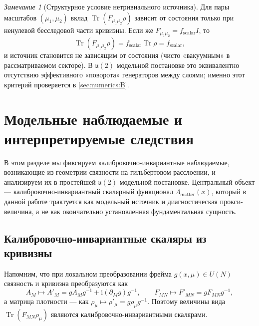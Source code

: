 \documentclass[11pt,a4paper]{article}
\DeclareMathOperator{\Tr}{Tr}
\newcommand{\ii}{\mathrm{i}}
\theoremstyle{definition}
\theoremstyle{plain}
\theoremstyle{remark}
\newtheorem{remark}{Замечание}[section]
\begin{document}
\begin{remark}[Структурное условие нетривиального источника]\label{rem:nontrivial_source}
Для пары масштабов $(\mu_1,\mu_2)$ вклад
$\Tr\!\left(F_{\mu_1\mu_2}\rho\right)$
зависит от состояния только при ненулевой бесследовой части кривизны.
Если же $F_{\mu_1\mu_2}=f_{\mathrm{scalar}}I$, то
\[
\Tr\!\left(F_{\mu_1\mu_2}\rho\right)=f_{\mathrm{scalar}}\Tr\rho=f_{\mathrm{scalar}},
\]
и источник становится не зависящим от состояния (чисто «вакуумным» в рассматриваемом секторе).
В $\mathfrak u(2)$ модельной постановке это эквивалентно отсутствию эффективного «поворота» генераторов между слоями;
именно этот критерий проверяется в \cref{sec:numerics:B}.
\end{remark}

\section{Модельные наблюдаемые и интерпретируемые следствия}
\label{sec:theory}

В этом разделе мы фиксируем калибровочно-инвариантные наблюдаемые, возникающие из геометрии связности на
гильбертовом расслоении, и анализируем их в простейшей $\mathfrak{u}(2)$ модельной постановке.
Центральный объект --- калибровочно-инвариантный скалярный функционал $\Lambda_{\mathrm{matter}}(x)$,
который в данной работе трактуется как модельный источник и диагностическая прокси-величина, а не как окончательно установленная фундаментальная сущность.

\subsection{Калибровочно-инвариантные скаляры из кривизны}
\label{sec:theory:gaugeinv}

Напомним, что при локальном преобразовании фрейма $g(x,\mu)\in U(N)$ связность и кривизна преобразуются как
\begin{equation}\label{eq:gauge_tr}
A_M \mapsto A'_M = gA_M g^{-1} + \ii(\partial_M g)g^{-1},
\qquad
F_{MN}\mapsto F'_{MN}=gF_{MN}g^{-1},
\end{equation}
а матрица плотности — как $\rho_\mu\mapsto \rho'_\mu=g\rho_\mu g^{-1}$.
Поэтому величины вида $\Tr(F_{MN}\rho_\mu)$ являются калибровочно-инвариантными скалярами.
\end{document}
